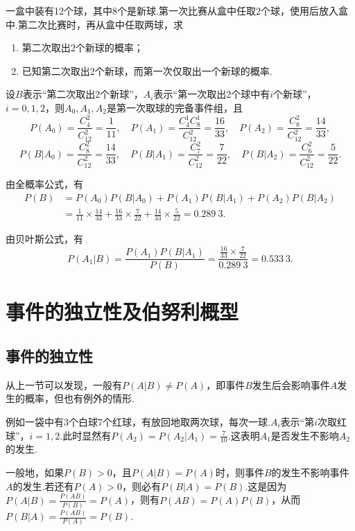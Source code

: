 \begin{example}
一盒中装有12个球，其中8个是新球.第一次比赛从盒中任取2个球，使用后放入盒中.第二次比赛时，再从盒中任取两球，求\begin{enumerate}
\item 第二次取出2个新球的概率；
\item 已知第二次取出2个新球，而第一次仅取出一个新球的概率.
\end{enumerate}
\begin{solution}
设\(B\)表示“第二次取出2个新球”，\(A_i\)表示“第一次取出2个球中有\(i\)个新球”，\(i=0,1,2\)，则\(A_0,A_1,A_2\)是第一次取球的完备事件组，且\[
P(A_0) = \frac{C_4^2}{C_{12}^2} = \frac{1}{11},
\quad
P(A_1) = \frac{C_4^1 C_8^1}{C_{12}^2} = \frac{16}{33},
\quad
P(A_2) = \frac{C_8^2}{C_{12}^2} = \frac{14}{33},
\]\[
P(B \vert A_0) = \frac{C_8^2}{C_{12}^2} = \frac{14}{33},
\quad
P(B \vert A_1) = \frac{C_7^2}{C_{12}^2} = \frac{7}{22},
\quad
P(B \vert A_2) = \frac{C_6^2}{C_{12}^2} = \frac{5}{22}.
\]

由全概率公式，有\begin{align*}
P(B) &= P(A_0) P(B \vert A_0)
	+ P(A_1) P(B \vert A_1)
	+ P(A_2) P(B \vert A_2) \\
&= \frac{1}{11} \times \frac{14}{33}
	+ \frac{16}{33} \times \frac{7}{22}
	+ \frac{14}{33} \times \frac{5}{22}
= 0.289\ 3.
\end{align*}

由贝叶斯公式，有\[
P(A_1 \vert B) = \frac{P(A_1) P(B \vert A_1)}{P(B)}
= \frac{\frac{16}{33} \times \frac{7}{22}}{0.289\ 3} = 0.533\ 3.
\]
\end{solution}
\end{example}

\section{事件的独立性及伯努利概型}
\subsection{事件的独立性}
从上一节可以发现，一般有\(P(A \vert B) \neq P(A)\)，即事件\(B\)发生后会影响事件\(A\)发生的概率，但也有例外的情形.

例如一袋中有3个白球7个红球，有放回地取两次球，每次一球.\(A_i\)表示“第\(i\)次取红球”，\(i=1,2\).此时显然有\(P(A_2) = P(A_2 \vert A_1) = \frac{7}{10}\).这表明\(A_1\)是否发生不影响\(A_2\)的发生.

一般地，如果\(P(B) > 0\)，且\(P(A \vert B) = P(A)\)时，则事件\(B\)的发生不影响事件\(A\)的发生.若还有\(P(A) > 0\)，则必有\(P(B \vert A) = P(B)\).这是因为\(P(A \vert B) = \frac{P(AB)}{P(B)} = P(A)\)，则有\(P(AB) = P(A) P(B)\)，从而\(P(B \vert A) = \frac{P(AB)}{P(A)} = P(B)\).

